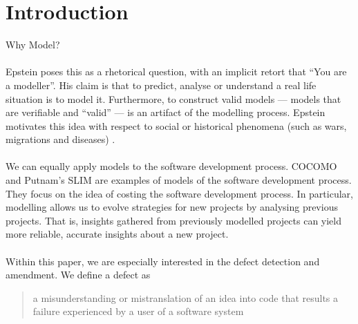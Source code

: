 \section{Introduction}

Why Model?\\
\\
Epstein poses this as a rhetorical question, with an implicit retort that “You
are a modeller”. His claim is that to predict, analyse or understand a real life
situation is to model it. Furthermore, to construct valid models --- models that
are verifiable and “valid” --- is an artifact of the modelling process. Epstein
motivates this idea with respect to social or historical phenomena (such as
    wars, migrations and diseases) \cite{epstein2008model}.\\
\\
We can equally apply models to the software development process.
COCOMO \cite{boehm1984software} and Putnam's SLIM \cite{putnam1978general} are examples of models of the software development process.
They focus on the idea of costing the software development process.
In particular, modelling allows us to evolve strategies for new projects by analysing previous projects.
That is, insights gathered from previously modelled projects can yield more reliable, accurate insights about a new project.\\
\\
Within this paper, we are especially interested in the defect detection and amendment.
We define a defect as
\begin{quote}
  a misunderstanding or mistranslation of an idea into code that results a
  failure experienced by a user of a software system
\end{quote}

